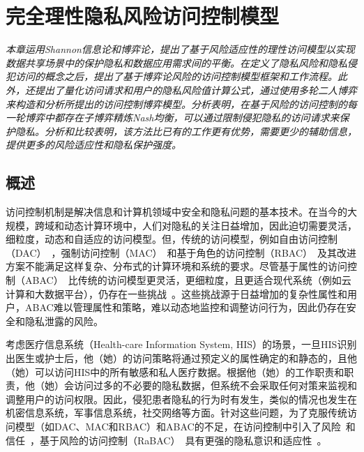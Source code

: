 \chapter{完全理性隐私风险访问控制模型}
\label{chap:game-theoretical-RaBAC-for-privacy}

\textit{}

\textit{本章运用Shannon信息论和博弈论，提出了基于风险适应性的理性访问模型以实现数据共享场景中的保护隐私和数据应用需求间的平衡。在定义了隐私风险和隐私侵犯访问的概念之后，提出了基于博弈论风险的访问控制模型框架和工作流程。此外，还提出了量化访问请求和用户的隐私风险值计算公式，通过使用多轮二人博弈来构造和分析所提出的访问控制博弈模型。分析表明，在基于风险的访问控制的每一轮博弈中都存在子博弈精炼Nash均衡，可以通过限制侵犯隐私的访问请求来保护隐私。分析和比较表明，该方法比已有的工作更有优势，需要更少的辅助信息，提供更多的风险适应性和隐私保护强度。}

\section{概述}

访问控制机制是解决信息和计算机领域中安全和隐私问题的基本技术。在当今的大规模，跨域和动态计算环境中，人们对隐私的关注日益增加，因此迫切需要灵活，细粒度，动态和自适应的访问模型。但，传统的访问模型，例如自由访问控制（DAC）~\cite{lampson1974protection}，强制访问控制（MAC）~\cite{bell1973secure}和基于角色的访问控制（RBAC）~\cite{sandhu1996role}及其改进方案不能满足这样复杂、分布式的计算环境和系统的要求。尽管基于属性的访问控制（ABAC）~\cite{kuhn2010adding}比传统的访问模型更灵活，更细粒度，且更适合现代系统（例如云计算和大数据平台），仍存在一些挑战~\cite{servos2017current,paci2018survey}。这些挑战源于日益增加的复杂性属性和用户，ABAC难以管理属性和策略，难以动态地监控和调整访问行为，因此仍存在安全和隐私泄露的风险。

考虑医疗信息系统（Health-care Information System, HIS）的场景，一旦HIS识别出医生或护士后，他（她）的访问策略将通过预定义的属性确定的和静态的，且他（她）可以访问HIS中的所有敏感和私人医疗数据。根据他（她）的工作职责和职责，他（她）会访问过多的不必要的隐私数据，但系统不会采取任何对策来监视和调整用户的访问权限。因此，侵犯患者隐私的行为时有发生，类似的情况也发生在机密信息系统，军事信息系统，社交网络等方面。针对这些问题，为了克服传统访问模型（如DAC、MAC和RBAC）和ABAC的不足，在访问控制中引入了风险~\cite{cheng2007fuzzy, zhang2018privacy}和信任~\cite{dimmock2004using, pustchi2015mt}，基于风险的访问控制（RaBAC）~\cite{cheng2007fuzzy}具有更强的隐私意识和适应性~\cite{ni2010risk, wang2011quantified, zhang2018privacy}。


